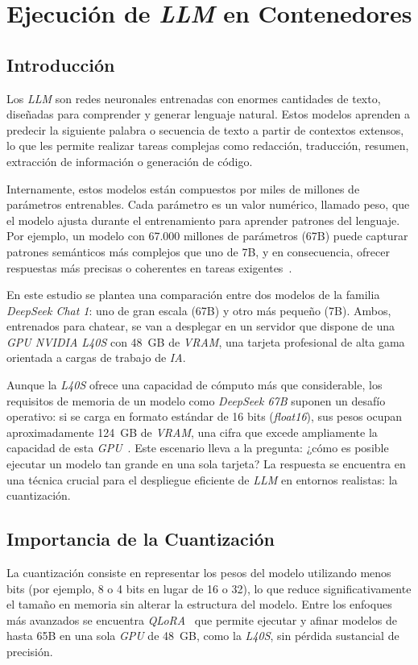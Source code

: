 
\chapter{Ejecución de \textit{LLM} en Contenedores}

\section{Introducción}
Los \textit{LLM} son redes neuronales entrenadas con enormes cantidades de texto, diseñadas para comprender y generar lenguaje natural. Estos modelos aprenden a predecir la siguiente palabra o secuencia de texto a partir de contextos extensos, lo que les permite realizar tareas complejas como redacción, traducción, resumen, extracción de información o generación de código.

Internamente, estos modelos están compuestos por miles de millones de parámetros entrenables. Cada parámetro es un valor numérico, llamado peso, que el modelo ajusta durante el entrenamiento para aprender patrones del lenguaje. Por ejemplo, un modelo con 67.000 millones de parámetros (67B) puede capturar patrones semánticos más complejos que uno de 7B, y en consecuencia, ofrecer respuestas más precisas o coherentes en tareas exigentes~\cite{ref26}.

En este estudio se plantea una comparación entre dos modelos de la familia \textit{DeepSeek Chat 1}: uno de gran escala (67B) y otro más pequeño (7B). Ambos, entrenados para chatear, se van a desplegar en un servidor que dispone de una \textit{GPU NVIDIA L40S} con 48~GB de \textit{VRAM}, una tarjeta profesional de alta gama orientada a cargas de trabajo de \textit{IA}.

Aunque la \textit{L40S} ofrece una capacidad de cómputo más que considerable, los requisitos de memoria de un modelo como \textit{DeepSeek 67B} suponen un desafío operativo: si se carga en formato estándar de 16 bits (\textit{float16}), sus pesos ocupan aproximadamente 124~GB de \textit{VRAM}, una cifra que excede ampliamente la capacidad de esta \textit{GPU}~\cite{ref27}. Este escenario lleva a la pregunta: ¿cómo es posible ejecutar un modelo tan grande en una sola tarjeta? La respuesta se encuentra en una técnica crucial para el despliegue eficiente de \textit{LLM} en entornos realistas: la cuantización.

\section{Importancia de la Cuantización}
La cuantización consiste en representar los pesos del modelo utilizando menos bits (por ejemplo, 8 o 4 bits en lugar de 16 o 32), lo que reduce significativamente el tamaño en memoria sin alterar la estructura del modelo. Entre los enfoques más avanzados se encuentra \textit{QLoRA}~\cite{ref28} que permite ejecutar y afinar modelos de hasta 65B en una sola \textit{GPU} de 48~GB, como la \textit{L40S}, sin pérdida sustancial de precisión.

